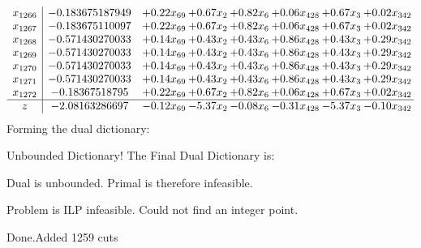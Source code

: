 \documentclass[8pt]{article}
\begin{document}
\[\begin{array}{c| c c@{\hskip 2pt} c@{\hskip 2pt} c@{\hskip 2pt} c@{\hskip 2pt} c@{\hskip 2pt} c@{\hskip 2pt} }
 x_{1266}   &  -0.183675187949 & +  0.22 x_{69} & +  0.67 x_{2} & +  0.82 x_{6} & +  0.06 x_{428} & +  0.67 x_{3} & +  0.02 x_{342}\\
 x_{1267}   &  -0.183675110097 & +  0.22 x_{69} & +  0.67 x_{2} & +  0.82 x_{6} & +  0.06 x_{428} & +  0.67 x_{3} & +  0.02 x_{342}\\
 x_{1268}   &  -0.571430270033 & +  0.14 x_{69} & +  0.43 x_{2} & +  0.43 x_{6} & +  0.86 x_{428} & +  0.43 x_{3} & +  0.29 x_{342}\\
 x_{1269}   &  -0.571430270033 & +  0.14 x_{69} & +  0.43 x_{2} & +  0.43 x_{6} & +  0.86 x_{428} & +  0.43 x_{3} & +  0.29 x_{342}\\
 x_{1270}   &  -0.571430270033 & +  0.14 x_{69} & +  0.43 x_{2} & +  0.43 x_{6} & +  0.86 x_{428} & +  0.43 x_{3} & +  0.29 x_{342}\\
 x_{1271}   &  -0.571430270033 & +  0.14 x_{69} & +  0.43 x_{2} & +  0.43 x_{6} & +  0.86 x_{428} & +  0.43 x_{3} & +  0.29 x_{342}\\
 x_{1272}   &  -0.18367518795 & +  0.22 x_{69} & +  0.67 x_{2} & +  0.82 x_{6} & +  0.06 x_{428} & +  0.67 x_{3} & +  0.02 x_{342}\\
\hline
z    &  -2.08163286697 & -0.12 x_{69} & -5.37 x_{2} & -0.08 x_{6} & -0.31 x_{428} & -5.37 x_{3} & -0.10 x_{342}\\
\end{array}\]
Forming the dual dictionary:

Unbounded Dictionary!
The Final Dual Dictionary is: 

 Dual is unbounded. Primal is therefore infeasible. 

Problem is ILP infeasible. Could not find an integer point. 

Done.Added 1259 cuts 
\end{document}
